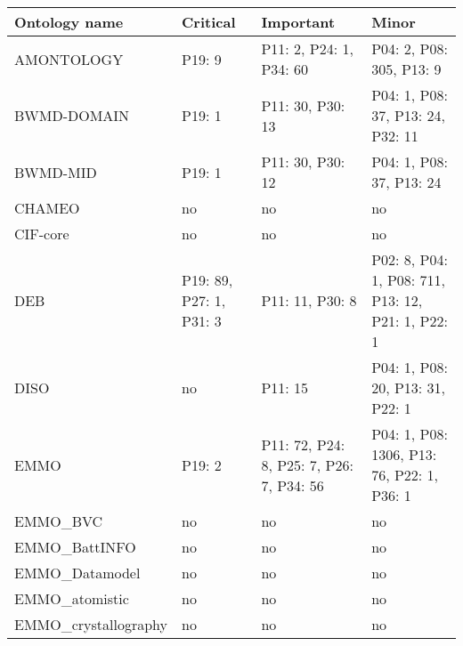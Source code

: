 \begin{tabular}{m{4cm}m{3cm}m{3cm}m{5cm}}
\toprule
          Ontology name &                Critical &                                Important &                                             Minor \\
\midrule
             AMONTOLOGY &                  P19: 9 &                  P11: 2, P24: 1, P34: 60 &                          P04: 2, P08: 305, P13: 9 \\
            BWMD-DOMAIN &                  P19: 1 &                         P11: 30, P30: 13 &                 P04: 1, P08: 37, P13: 24, P32: 11 \\
               BWMD-MID &                  P19: 1 &                         P11: 30, P30: 12 &                          P04: 1, P08: 37, P13: 24 \\
                 CHAMEO &                      no &                                       no &                                                no \\
               CIF-core &                      no &                                       no &                                                no \\
                    DEB & P19: 89, P27: 1, P31: 3 &                          P11: 11, P30: 8 & P02: 8, P04: 1, P08: 711, P13: 12, P21: 1, P22: 1 \\
                   DISO &                      no &                                  P11: 15 &                  P04: 1, P08: 20, P13: 31, P22: 1 \\
                   EMMO &                  P19: 2 & P11: 72, P24: 8, P25: 7, P26: 7, P34: 56 &        P04: 1, P08: 1306, P13: 76, P22: 1, P36: 1 \\
               EMMO_BVC &                      no &                                       no &                                                no \\
          EMMO_BattINFO &                      no &                                       no &                                                no \\
         EMMO_Datamodel &                      no &                                       no &                                                no \\
         EMMO_atomistic &                      no &                                       no &                                                no \\
   EMMO_crystallography &                      no &                                       no &                                                no \\

\end{tabular}
